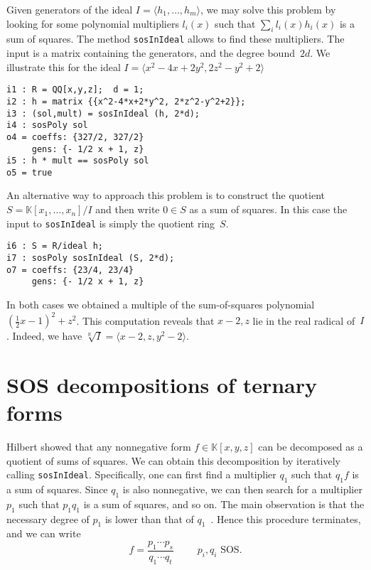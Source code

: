 \documentclass[11pt]{amsart}
\theoremstyle{plain}%
\theoremstyle{definition}
\theoremstyle{remark}
\newcommand{\RR}{\mathbb{R}}
\newcommand{\kk}{\mathbb{K}}
\begin{document}
Given generators of the ideal $I=\langle h_1,\dots,h_m\rangle$, we may solve this problem by looking for some polynomial multipliers $l_i(x)$ such that  $\sum_i l_i(x) h_i(x)$ is a sum of squares.
The method \verb|sosInIdeal| allows to find these multipliers.
The input is a matrix containing the generators, and the degree bound~$2d$.
We illustrate this for the ideal 
$I=\langle x^2{-}4 x{+}2 y^2, 2 z^2{-}y^2{+}2 \rangle$
{\small
\begin{verbatim}
i1 : R = QQ[x,y,z];  d = 1;
i2 : h = matrix {{x^2-4*x+2*y^2, 2*z^2-y^2+2}};
i3 : (sol,mult) = sosInIdeal (h, 2*d);
i4 : sosPoly sol
o4 = coeffs: {327/2, 327/2}
     gens: {- 1/2 x + 1, z}
i5 : h * mult == sosPoly sol
o5 = true
\end{verbatim}
}
\noindent
An alternative way to approach this problem is to construct the quotient $S = \kk[x_{1},\dots,x_{n}]/I$ and then write $0\in S$ as a sum of squares.
In this case the input to \verb|sosInIdeal| is simply the quotient ring~$S$.
{\small
\begin{verbatim}
i6 : S = R/ideal h;
i7 : sosPoly sosInIdeal (S, 2*d);
o7 = coeffs: {23/4, 23/4}
     gens: {- 1/2 x + 1, z}
\end{verbatim}
}
\noindent
In both cases we obtained a multiple of the sum-of-squares polynomial $(\frac{1}{2}x{-}1)^2{+}z^2$.
This computation reveals that $x{-}2,z$ lie in the real radical of~$I$.
Indeed, we have $\sqrt[\RR]{I} = \langle x{-}2,z,y^2{-}2\rangle$.

\section{SOS decompositions of ternary forms}

Hilbert showed that any nonnegative form $f\in \kk[x,y,z]$ can be decomposed as a quotient of sums of squares.
We can obtain this decomposition by iteratively calling \verb|sosInIdeal|.
Specifically, one can first find a multiplier $q_{1}$ such that $q_{1}f$ is a sum of squares.
Since $q_1$ is also nonnegative, we can then search for a multiplier $p_{1}$ such that $p_{1}q_{1}$ is a sum of squares, and so on.
The main observation is that the necessary degree of $p_{1}$ is lower than that of $q_{1}$~\cite{de2004products}.
Hence this procedure terminates, and we can write
\[
  f = \frac{p_{1}\cdots p_{s}}{q_{1}\cdots q_{t}} \qquad \text {
    $p_{i},q_{i}$ SOS}.
\]
\end{document}
